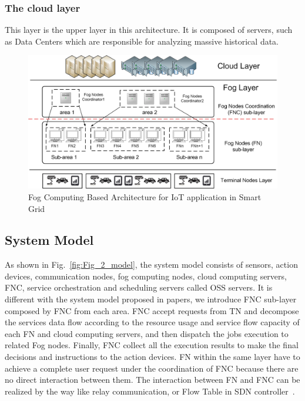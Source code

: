 \documentclass[conference]{IEEEtran}
\begin{document}
\subsubsection{The cloud layer} This layer is the upper layer in this architecture. It is composed of servers, such as Data Centers which are responsible for analyzing massive historical data. 


\begin{figure}[h]
	\centering\includegraphics[width=3.4 in]{figures/Fig_1_architecture} 
	\caption{Fog Computing Based Architecture for IoT application in Smart Grid}\label{fig:Fig_1_architecture} %
\end{figure}




\subsection{System Model}
As shown in Fig.~\ref{fig:Fig_2_model}, the system model consists of sensors, action devices, communication nodes, fog computing nodes, cloud computing servers, FNC, service orchestration and scheduling servers called OSS servers. It is different with the system model proposed in papers, we introduce FNC sub-layer composed by FNC from each area. FNC accept requests from TN and decompose the services data flow according to the resource usage and service flow capacity of each FN and cloud computing servers, and then dispatch the jobs execution to related Fog nodes. Finally, FNC collect all the execution results to make the final decisions and instructions to the action devices. FN within the same layer have to achieve a complete user request under the coordination of FNC because there are no direct interaction between them. The interaction between FN and FNC can be realized by the way like relay communication, or Flow Table in SDN controller~\cite{Yiming2016}. 
\end{document}
